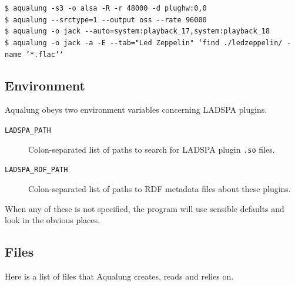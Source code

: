 \documentclass[10pt,english]{article}
\begin{document}
\begin{description}

\item [
\texttt{\$ aqualung -s3 -o alsa -R -r 48000 -d plughw:0,0}
]

\item [
\texttt{\$ aqualung {-}{-}srctype=1 {-}{-}output oss {-}{-}rate 96000}
]

\item [
\texttt{\$ aqualung -o jack {-}{-}auto=system:playback\_17,system:playback\_18}
]

\item [
\texttt{\$ aqualung -o jack -a -E {-}{-}tab="Led Zeppelin" `find ./ledzeppelin/ -name '*.flac'`}
]

\end{description}




\subsection{Environment\label{idp451152}}



\noindent Aqualung obeys two environment variables
concerning LADSPA plugins.


\begin{description}

\item [
\texttt{LADSPA\_PATH}
]

Colon-separated list of paths to search for LADSPA
plugin \texttt{.so} files.

\item [
\texttt{LADSPA\_RDF\_PATH}
]

Colon-separated list of paths to RDF metadata files
about these plugins.

\end{description}



\noindent When any of these is not specified, the
program will use sensible defaults and look in the obvious
places.




\subsection{Files\label{idp456976}}



\noindent Here is a list of files that Aqualung creates, reads and
relies on.
\end{document}
